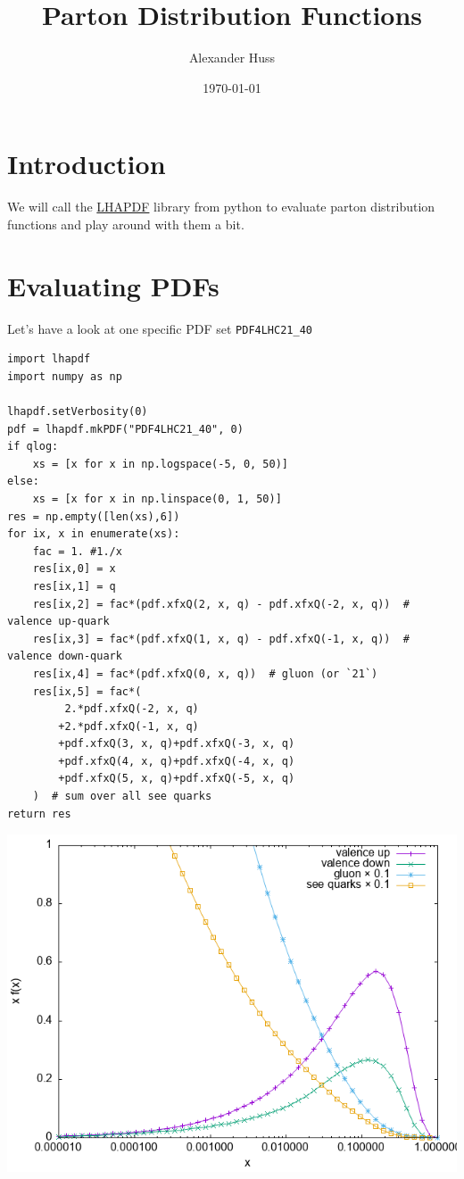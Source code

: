 \documentclass[11pt]{article}
\author{Alexander Huss}
\date{\today}
\title{Parton Distribution Functions}
\begin{document}
\maketitle
\tableofcontents



\section{Introduction}
\label{sec:org76b74a7}
We will call the \href{https://lhapdf.hepforge.org/}{LHAPDF} library from python to evaluate parton distribution functions and play around with them a bit.

\section{Evaluating PDFs}
\label{sec:orge6e5fa1}
Let's have a look at one specific PDF set \texttt{PDF4LHC21\_40}

\begin{verbatim}
import lhapdf
import numpy as np

lhapdf.setVerbosity(0)
pdf = lhapdf.mkPDF("PDF4LHC21_40", 0)
if qlog:
    xs = [x for x in np.logspace(-5, 0, 50)]
else:
    xs = [x for x in np.linspace(0, 1, 50)]
res = np.empty([len(xs),6])
for ix, x in enumerate(xs):
    fac = 1. #1./x
    res[ix,0] = x
    res[ix,1] = q
    res[ix,2] = fac*(pdf.xfxQ(2, x, q) - pdf.xfxQ(-2, x, q))  # valence up-quark
    res[ix,3] = fac*(pdf.xfxQ(1, x, q) - pdf.xfxQ(-1, x, q))  # valence down-quark
    res[ix,4] = fac*(pdf.xfxQ(0, x, q))  # gluon (or `21`)
    res[ix,5] = fac*(
         2.*pdf.xfxQ(-2, x, q)
        +2.*pdf.xfxQ(-1, x, q)
        +pdf.xfxQ(3, x, q)+pdf.xfxQ(-3, x, q)
        +pdf.xfxQ(4, x, q)+pdf.xfxQ(-4, x, q)
        +pdf.xfxQ(5, x, q)+pdf.xfxQ(-5, x, q)
    )  # sum over all see quarks
return res
\end{verbatim}

\begin{center}
\includegraphics[width=.9\linewidth]{pdf_xfx.png}
\end{center}
\end{document}
